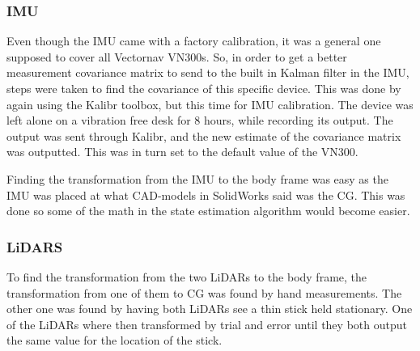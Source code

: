 \subsubsection{IMU}

Even though the IMU came with a factory calibration, it was a general one supposed to cover all Vectornav VN300s. So, in order to get a better measurement covariance matrix to send to the built in Kalman filter in the IMU, steps were taken to find the covariance of this specific device. This was done by again using the Kalibr toolbox, but this time for IMU calibration. The device was left alone on a vibration free desk for 8 hours, while recording its output. The output was sent through Kalibr, and the new estimate of the covariance matrix was outputted. This was in turn set to the default value of the VN300. 

Finding the transformation from the IMU to the body frame was easy as the IMU was placed at what CAD-models in SolidWorks said was the CG. This was done so some of the math in the state estimation algorithm would become easier.

\subsubsection{LiDARS}

To find the transformation from the two LiDARs to the body frame, the transformation from one of them to CG was found by hand measurements. The other one was found by having both LiDARs see a thin stick held stationary. One of the LiDARs where then transformed by trial and error until they both output the same value for the location of the stick. 